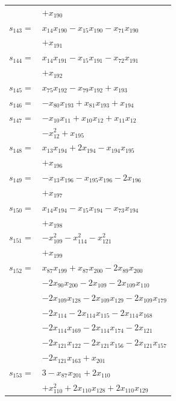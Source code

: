 \begin{longtable}{@{}r@{\;}l@{}}
 & \(\displaystyle +x_{190}\) \\[3pt]
\(s_{143}=\) & \(\displaystyle x_{14}x_{190} -x_{15}x_{190} -x_{71}x_{190}\) \\
 & \(\displaystyle +x_{191}\) \\[3pt]
\(s_{144}=\) & \(\displaystyle x_{14}x_{191} -x_{15}x_{191} -x_{72}x_{191}\) \\
 & \(\displaystyle +x_{192}\) \\[3pt]
\(s_{145}=\) & \(\displaystyle x_{75}x_{192} -x_{79}x_{192} +x_{193}\) \\[3pt]
\(s_{146}=\) & \(\displaystyle -x_{80}x_{193} +x_{81}x_{193} +x_{194}\) \\[3pt]
\(s_{147}=\) & \(\displaystyle -x_{10}x_{11} +x_{10}x_{12} +x_{11}x_{12}\) \\
 & \(\displaystyle -x_{12}^{2} +x_{195}\) \\[3pt]
\(s_{148}=\) & \(\displaystyle x_{13}x_{194} +2x_{194} -x_{194}x_{195}\) \\
 & \(\displaystyle +x_{196}\) \\[3pt]
\(s_{149}=\) & \(\displaystyle -x_{13}x_{196} -x_{195}x_{196} -2x_{196}\) \\
 & \(\displaystyle +x_{197}\) \\[3pt]
\(s_{150}=\) & \(\displaystyle x_{14}x_{194} -x_{15}x_{194} -x_{73}x_{194}\) \\
 & \(\displaystyle +x_{198}\) \\[3pt]
\(s_{151}=\) & \(\displaystyle -x_{109}^{2} -x_{114}^{2} -x_{121}^{2}\) \\
 & \(\displaystyle +x_{199}\) \\[3pt]
\(s_{152}=\) & \(\displaystyle x_{87}x_{199} +x_{87}x_{200} -2x_{89}x_{200}\) \\
 & \(\displaystyle -2x_{90}x_{200} -2x_{109} -2x_{109}x_{110}\) \\
 & \(\displaystyle -2x_{109}x_{128} -2x_{109}x_{129} -2x_{109}x_{179}\) \\
 & \(\displaystyle -2x_{114} -2x_{114}x_{115} -2x_{114}x_{168}\) \\
 & \(\displaystyle -2x_{114}x_{169} -2x_{114}x_{174} -2x_{121}\) \\
 & \(\displaystyle -2x_{121}x_{122} -2x_{121}x_{156} -2x_{121}x_{157}\) \\
 & \(\displaystyle -2x_{121}x_{163} +x_{201}\) \\[3pt]
\(s_{153}=\) & \(\displaystyle 3 -x_{87}x_{201} +2x_{110}\) \\
 & \(\displaystyle +x_{110}^{2} +2x_{110}x_{128} +2x_{110}x_{129}\) \\

\end{longtable}
